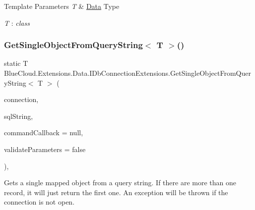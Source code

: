 \begin{DoxyTemplParams}{Template Parameters}
{\em T} & \mbox{\hyperlink{namespace_blue_cloud_1_1_extensions_1_1_data}{Data}} Type\\
\hline
\end{DoxyTemplParams}
\begin{Desc}
\item[Type Constraints]\begin{description}
\item[{\em T} : {\em class}]\end{description}
\end{Desc}
\mbox{\label{class_blue_cloud_1_1_extensions_1_1_data_1_1_i_db_connection_extensions_a9e64ad9f06cca43d119fc75364dcba7f}} 
\subsubsection{\texorpdfstring{Get\+Single\+Object\+From\+Query\+String$<$ T $>$()}{GetSingleObjectFromQueryString< T >()}}
{\footnotesize\ttfamily static T Blue\+Cloud.\+Extensions.\+Data.\+I\+Db\+Connection\+Extensions.\+Get\+Single\+Object\+From\+Query\+String$<$ T $>$ (\begin{DoxyParamCaption}\item[{this I\+Db\+Connection}]{connection,  }\item[{string}]{sql\+String,  }\item[{Action$<$ I\+Db\+Command $>$}]{command\+Callback = {\ttfamily null},  }\item[{bool}]{validate\+Parameters = {\ttfamily false} }\end{DoxyParamCaption})\hspace{0.3cm}{\ttfamily [inline]}, {\ttfamily [static]}}



Gets a single mapped object from a query string. If there are more than one record, it will just return the first one. An exception will be thrown if the connection is not open. 

